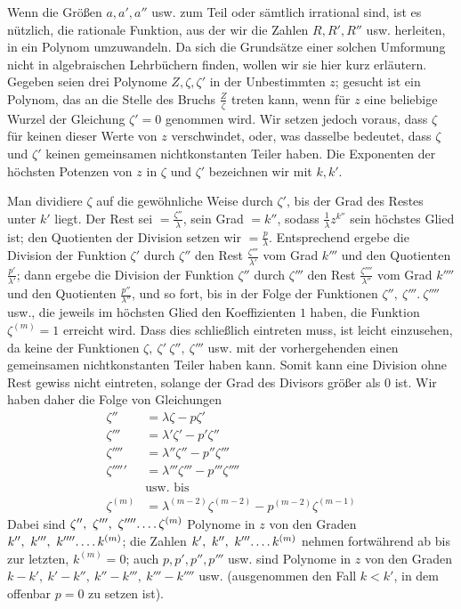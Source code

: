 Wenn die Größen $a, a', a''$ usw. zum Teil oder sämtlich irrational sind, ist es nützlich, die rationale Funktion, aus der wir die Zahlen $R, R', R''$ usw. herleiten, in ein Polynom umzuwandeln. Da sich die Grundsätze einer solchen Umformung nicht in algebraischen Lehrbüchern finden, wollen wir sie hier kurz erläutern. Gegeben seien drei Polynome $Z,\zeta,\zeta'$ in der Unbestimmten $z$; gesucht ist ein Polynom, das an die Stelle des Bruchs $\frac Z\zeta$ treten kann, wenn für $z$ eine beliebige Wurzel der Gleichung $\zeta'=0$ genommen wird. Wir setzen jedoch voraus, dass $\zeta$ für keinen dieser Werte von $z$ verschwindet, oder, was dasselbe bedeutet, dass $\zeta$ und $\zeta'$ keinen gemeinsamen nichtkonstanten Teiler haben. Die Exponenten der höchsten Potenzen von $z$ in $\zeta$ und $\zeta'$ bezeichnen wir mit $k,k'$.

Man dividiere $\zeta$ auf die gewöhnliche Weise durch $\zeta'$, bis der Grad des Restes unter $k'$ liegt. Der Rest sei $=\frac{\zeta''}{\lambda}$, sein Grad $=k''$, sodass $\frac1\lambda z^{k''}$ sein höchstes Glied ist; den Quotienten der Division setzen wir $=\frac p\lambda$. Entsprechend ergebe die Division der Funktion $\zeta'$ durch $\zeta''$ den Rest $\frac{\zeta'''}{\lambda'}$ vom Grad $k'''$ und den Quotienten $\frac{p'}{\lambda'}$; dann ergebe die Division der Funktion $\zeta''$ durch $\zeta'''$ den Rest $\frac{\zeta''''}{\lambda''}$ vom Grad $k''''$ und den Quotienten $\frac{p''}{\lambda''}$, und so fort, bis in der Folge der Funktionen $\zeta'',\ \zeta'''.\ \zeta''''$ usw., die jeweils im höchsten Glied den Koeffizienten $1$ haben, die Funktion $\zeta^{(m)}=1$ erreicht wird. Dass dies schließlich eintreten muss, ist leicht einzusehen, da keine der Funktionen $\zeta,\ \zeta'\ \zeta'',\ \zeta'''$ usw. mit der vorhergehenden einen gemeinsamen nichtkonstanten Teiler haben kann. Somit kann eine Division ohne Rest gewiss nicht eintreten, solange der Grad des Divisors größer als $0$ ist. Wir haben daher die Folge von Gleichungen
\[
\begin{aligned}
\zeta''&=\lambda\zeta-p\zeta'\\
\zeta'''&=\lambda'\zeta'-p'\zeta''\\
\zeta''''&=\lambda''\zeta''-p''\zeta'''\\
\zeta'''''&=\lambda'''\zeta'''-p'''\zeta''''\\
&\text{usw. bis}\\
\zeta^{(m)}&=\lambda^{(m-2)}\zeta^{(m-2)}-p^{(m-2)}\zeta^{(m-1)}
\end{aligned}
\]
Dabei sind $\zeta'',\allowbreak \ \zeta''',\allowbreak \ \zeta''''\ldotp\ldotp\ldotp\ldotp\zeta^{(m)}$ Polynome in $z$ von den Graden $k'',\allowbreak \ k''',\allowbreak \ k''''\ldotp\ldotp\ldotp\ldotp k^{(m)}$; die Zahlen $k',\allowbreak \ k'',\allowbreak \ k'''\ldotp\ldotp\ldotp\ldotp k^{(m)}$ nehmen fortwährend ab bis zur letzten, $k^{(m)}=0$; auch $p,\allowbreak p',\allowbreak p'',\allowbreak p'''$ usw. sind Polynome in $z$ von den Graden $k-k',\allowbreak \ k'-k'',\allowbreak \ k''-k''',\allowbreak \ k'''-k''''$ usw. (ausgenommen den Fall $k<k'$, in dem offenbar $p=0$ zu setzen ist).

